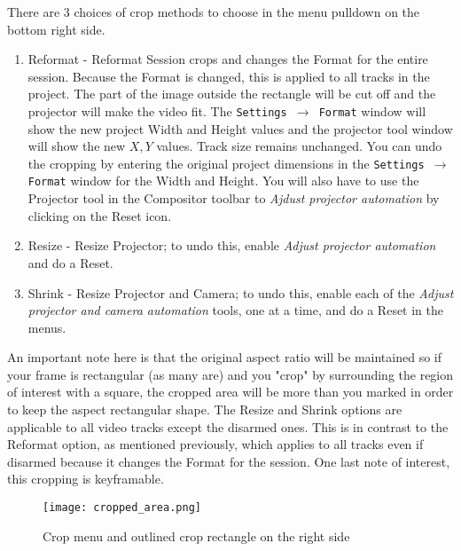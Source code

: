 There are 3 choices of crop methods to choose in the menu pulldown on the bottom right side.
\begin{enumerate}
     \item Reformat - Reformat Session crops and changes the Format for the entire session. 
Because the Format is changed, this is applied to all tracks in the project.
The part of the image outside the rectangle will be cut off and the projector will make the video fit.
The  \texttt{Settings $\rightarrow$ Format} window will show the new project Width and Height values and
the projector tool window will show the new $X, Y$ values. Track size remains unchanged.
You can undo the cropping by entering the original project dimensions in the
\texttt{Settings $\rightarrow$ Format} window for the Width and Height.  You will also have to use the Projector
tool in the Compositor toolbar to \textit{Ajdust projector automation} by clicking on the Reset icon.
     \item Resize - Resize Projector; to undo this, enable \textit{Adjust projector automation} 
and do a Reset.
     \item Shrink - Resize Projector and Camera; to undo this, enable each of the \textit{Adjust
projector and camera automation} tools, one at a time, and do a Reset in the menus.
\end{enumerate}
An important note here is that the original aspect ratio will be maintained so if your frame is
rectangular (as many are) and you "crop" by surrounding the region of interest with a square,
the cropped area will be more than you marked in order to keep the aspect rectangular shape.
The Resize and Shrink options are applicable to all video tracks except the disarmed ones. 
This is in contrast to the Reformat option, as mentioned previously, which applies to all tracks even if disarmed because it changes the Format for the session.
One last note of interest, this cropping is keyframable.

\begin{figure}[htpb]
    \centering
    \texttt{[image: cropped\_area.png]}
    \caption{Crop menu and outlined crop rectangle on the right side}
    \label{fig:cropped_area}
\end{figure}

